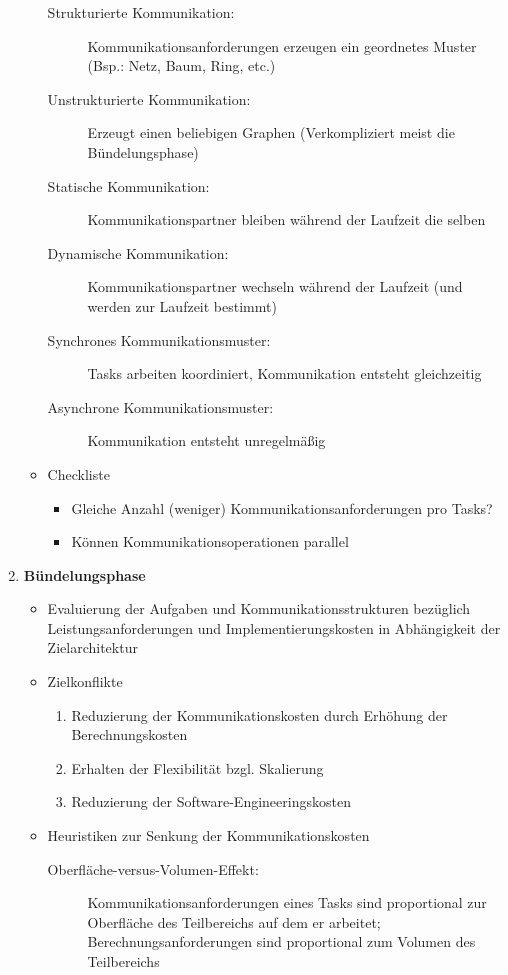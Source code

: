 \begin{enumerate}
\begin{itemize}
\begin{description}
			\item[Strukturierte Kommunikation:] Kommunikationsanforderungen erzeugen ein geordnetes Muster (Bsp.: Netz, Baum, Ring, etc.)
			\item[Unstrukturierte Kommunikation:] Erzeugt einen beliebigen Graphen (Verkompliziert meist die Bündelungsphase)
			\item[Statische Kommunikation:] Kommunikationspartner bleiben während der Laufzeit die selben
			\item[Dynamische Kommunikation:] Kommunikationspartner wechseln während der Laufzeit (und werden zur Laufzeit bestimmt)
			\item[Synchrones Kommunikationsmuster:] Tasks arbeiten koordiniert, Kommunikation entsteht gleichzeitig
			\item[Asynchrone Kommunikationsmuster:] Kommunikation entsteht unregelmäßig
		\end{description}
		\item Checkliste
		\begin{itemize}
			\item Gleiche Anzahl (weniger) Kommunikationsanforderungen pro Tasks?
			\item Können Kommunikationsoperationen parallel 
		\end{itemize}
	\end{itemize}
	\item \textbf{Bündelungsphase}
	\begin{itemize}
		\item Evaluierung der Aufgaben und Kommunikationsstrukturen bezüglich Leistungsanforderungen und Implementierungskosten in Abhängigkeit der Zielarchitektur
		\item Zielkonflikte
		\begin{enumerate}
			\item Reduzierung der Kommunikationskosten durch Erhöhung der Berechnungskosten
			\item Erhalten der Flexibilität bzgl. Skalierung
			\item Reduzierung der Software-Engineeringskosten
		\end{enumerate}
		\item Heuristiken zur Senkung der Kommunikationskosten
		\begin{description}
			\item[Oberfläche-versus-Volumen-Effekt:] Kommunikationsanforderungen eines Tasks sind proportional zur Oberfläche des Teilbereichs auf dem er arbeitet; Berechnungsanforderungen sind proportional zum Volumen des Teilbereichs

\end{description}
\end{itemize}
\end{enumerate}
